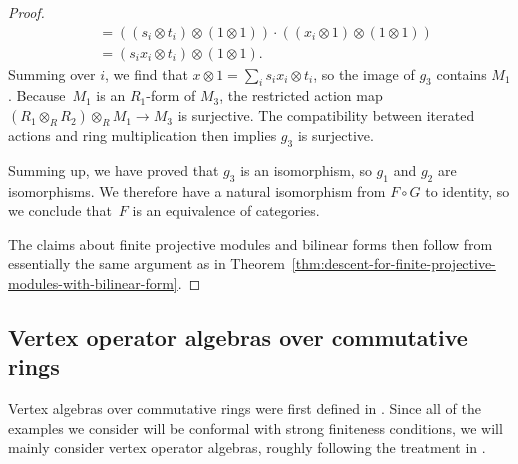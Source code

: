\documentclass[pdftex]{sigma}
\theoremstyle{definition}
\begin{document}
\begin{proof}
\begin{align*}
&= ((s_i \otimes t_i) \otimes (1 \otimes 1))\cdot ((x_i \otimes 1) \otimes (1 \otimes 1)) \\
&= (s_i x_i \otimes t_i) \otimes (1 \otimes 1).
\end{align*}
Summing over $i$, we find that $x \otimes 1 = \sum_i s_i x_i \otimes t_i$, so the image of $g_3$ contains $M_1$. Because~$M_1$ is an $R_1$-form of $M_3$, the restricted action map $(R_1 \otimes_{R} R_2) \otimes_{R} M_1 \to M_3$ is surjective. The compatibility between iterated actions and ring multiplication then implies $g_3$ is surjective.

Summing up, we have proved that $g_3$ is an isomorphism, so $g_1$ and $g_2$ are isomorphisms. We therefore have a natural isomorphism from $F \circ G$ to identity, so we conclude that~$F$ is an equivalence of categories.

The claims about finite projective modules and bilinear forms then follow from essentially the same argument as in Theorem~\ref{thm:descent-for-finite-projective-modules-with-bilinear-form}.
\end{proof}

\subsection{Vertex operator algebras over commutative rings}

Vertex algebras over commutative rings were first defined in \cite{B86}. Since all of the examples we consider will be conformal with strong finiteness conditions, we will mainly consider vertex operator algebras, roughly following the treatment in \cite{DR13}.
\end{document}
